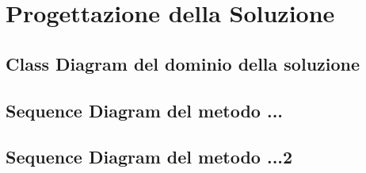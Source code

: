 \chapter{Progettazione della Soluzione}

\section{Class Diagram del dominio della soluzione}
\section{Sequence Diagram del metodo ...}
\section{Sequence Diagram del metodo ...2}
